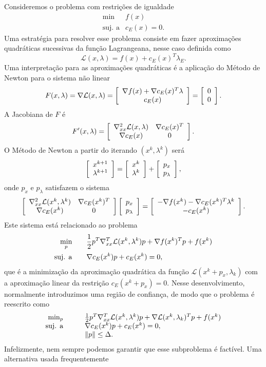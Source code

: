 Consideremos o problema com restrições de igualdade
\begin{equation*}
 \begin{array}{rl}
  \min & f(x) \\
   \mbox{suj. a} & c_E(x) =  0.
 \end{array}
\end{equation*}
Uma estratégia para resolver esse problema consiste em fazer aproximações
quadráticas sucessivas da função Lagrangeana, nesse caso definida como
$$ \mathcal{L}(x,\lambda) = f(x) + c_E(x)^T\lambda_E. $$
Uma interpretação para as aproximações quadráticas é a aplicação do Método de
Newton para o sistema não linear
$$ F(x,\lambda) = \nabla\mathcal{L}(x,\lambda) = \left[\begin{array}{c}\nabla f(x) + \nabla
c_E(x)^T\lambda \\ c_E(x)\end{array}\right] = \left[\begin{array}{c}0 \\ 0\end{array}\right]. $$
A Jacobiana de $F$ é
$$ F'(x,\lambda) = \left[\begin{array}{cc}\nabla_{xx}^2\mathcal{L}(x,\lambda) & \nabla
c_E(x)^T \\ \nabla c_E(x) & 0\end{array}\right]. $$
O Método de Newton a partir do iterando $(x^k,\lambda^k)$ será
$$ \left[\begin{array}{c}x^{k+1} \\ \lambda^{k+1}\end{array}\right] = \left[\begin{array}{c}x^k \\ \lambda^k\end{array}\right] +
\left[\begin{array}{c}p_x \\ p_{\lambda}\end{array}\right], $$
onde $p_x$ e $p_\lambda$ satisfazem o sistema
$$ \left[\begin{array}{cc}\nabla_{xx}^2 \mathcal{L}(x^k,\lambda^k) & \nabla c_E(x^k)^T \\ \nabla
c_E(x^k) & 0\end{array}\right] \left[\begin{array}{c}p_x \\ p_\lambda\end{array}\right] = \left[\begin{array}{c}-\nabla f(x^k) - \nabla
c_E(x^k)^T\lambda^k \\ -c_E(x^k)\end{array}\right].$$
Este sistema está relacionado ao problema
\begin{align*}
  \min_p \qquad & \frac{1}{2} p^T\nabla_{xx}^T\mathcal{L}(x^k,\lambda^k) p + \nabla f(x^k)^Tp +
  f(x^k) \\
  \mbox{suj. a} \qquad & \nabla c_E(x^k)p + c_E(x^k) = 0,
\end{align*}
que é a minimização da aproximação quadrática da função $\mathcal{L}(x^k+p_x,\lambda_k)$
com a aproximação linear da restrição $c_E(x^k + p_x) = 0$.
Nesse desenvolvimento, normalmente introduzimos uma região de confiança, de modo
que o problema é reescrito como
\begin{equation}\visiblelbl{prob:sqp}
  \begin{array}{rl}
  \min_p \qquad & \meio p^T\nabla_{xx}^T\mathcal{L}(x^k,\lambda^k) p + 
    \nabla \mathcal{L}(x^k,\lambda_k)^Tp + f(x^k) \\
  \mbox{suj. a} \qquad & \nabla c_E(x^k)p + c_E(x^k) = 0, \\
                    & \norma{p} \leq \Delta.
  \end{array}
\end{equation}
Infelizmente, nem sempre podemos garantir que esse subproblema é factível. Uma
alternativa usada frequentemente
\cite{bib:lalee-implementation, bib:byrd-trust-region, bib:byrd-interior-point,
bib:dennis-convergence-theory, bib:el-alem-1997, bib:el-alem-1999,
bib:chico-nonlinear-programming, bib:chico-gmm99, bib:chico-dci,
bib:curtis-matrix-free, bib:wachter-interior-point}
